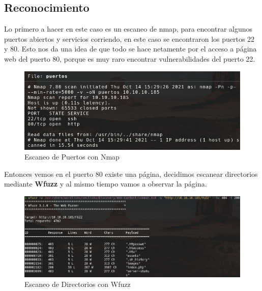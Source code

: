 \documentclass{article}
\begin{document}
\subsection{Reconocimiento}
Lo primero a hacer en este caso es un escaneo de nmap, para encontrar algunos puertos abiertos y servicios corriendo, en este caso se encontraron los puertos 22 y 80. Esto nos da una idea de que todo se hace netamente por el acceso a página web del puerto 80, porque es muy raro encontrar vulnerabilidades del puerto 22.
\begin{figure}[h]
	\center 
	\includegraphics[width=\textwidth]{images/magic/nmap.png}
	\caption{Escaneo de Puertos con Nmap}
\end{figure}
Entonces vemos en el puerto 80 existe una página, decidimos escanear directorios mediante \textbf{Wfuzz} y al mismo tiempo vamos a observar la página.
\begin{figure}[h]
	\center 
	\includegraphics[width=\textwidth]{images/magic/wfuzz.png}
	\caption{Escaneo de Directorios con Wfuzz}
\end{figure}

\clearpage
\end{document}
